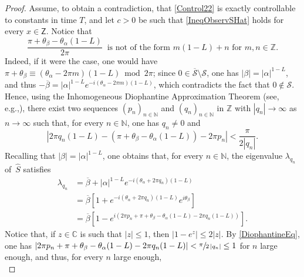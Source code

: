 \documentclass[10pt]{article}
\newcommand{\eg}{e.g.,\xspace}
\renewcommand{\eg}{e.g.,\xspace}
\theoremstyle{plain}
\theoremstyle{definition}
\newcommand{\abs}[1]{\left\lvert #1\right \rvert}
\numberwithin{equation}{section}\numberwithin{figure}{section}\emergencystretch=3em
\begin{document}
\begin{proof}
Assume, to obtain a contradiction, that \eqref{Control22} is exactly controllable to constants in time $T$, and let $c > 0$ be such that \eqref{IneqObservSHat} holds for every $x \in \mathsf Z$. Notice that
\begin{equation}\label{eq:mn}
\frac{\pi + \theta_\beta - \theta_\alpha(1 - L)}{2 \pi}\ \text{ is not of the form } m (1 - L) + n \text{ for } m, n \in \mathbb Z.
\end{equation}
Indeed, if it were the case, one would have $\pi + \theta_\beta \equiv (\theta_\alpha - 2 \pi m) (1 - L) \bmod 2 \pi$; since $0 \in \overline{\mathcal S} \setminus \mathcal S$, one has $\abs{\beta} = \abs{\alpha}^{1 - L}$, and thus $-\overline\beta = \abs{\alpha}^{1 - L} e^{- i (\theta_\alpha - 2 \pi m) (1 - L)}$, which contradicts the fact that $0 \notin \mathcal S$. Hence, using the Inhomogeneous Diophantine Approximation Theorem (see, \eg \cite[Chap.\,III, Th.\,II\,A]{Cassels1957Introduction}), there exist two sequences $(p_n)_{n \in \mathbb N}$ and $(q_n)_{n \in \mathbb N}$ in $\mathbb Z$ with $\abs{q_n} \to \infty$ as $n \to \infty$ such that, for every $n \in \mathbb N$, one has $q_n \neq 0$ and
\begin{equation}
\label{DiophantineEq}
\abs{2 \pi q_n (1 - L) - (\pi + \theta_\beta - \theta_\alpha (1 - L)) - 2 \pi p_n} < \frac{\pi}{2 \abs{q_n}}.
\end{equation}
Recalling that $\abs{\beta} = \abs{\alpha}^{1 - L}$, one obtains that, for every $n \in \mathbb N$, the eigenvalue $\lambda_{q_n}$ of~$\widehat S$ satisfies
\begin{equation}
\label{LambdaN}
\begin{aligned}
\lambda_{q_n} & = \overline\beta + \abs{\alpha}^{1 - L} e^{- i (\theta_\alpha + 2 \pi q_n)(1 - L)} \\
& = \overline\beta\left[1 + e^{-i(\theta_\alpha + 2 \pi q_n)(1 - L)} e^{i \theta_\beta}\right] \\
& = \overline\beta\left[1 - e^{i (2 \pi p_n + \pi + \theta_\beta - \theta_\alpha(1 - L) - 2 \pi q_n (1 - L))}\right].
\end{aligned}
\end{equation}
Notice that, if $z \in \mathbb C$ is such that $\abs{z} \leq 1$, then $\abs{1 - e^z} \leq 2 \abs{z}$. By \eqref{DiophantineEq}, one has $\lvert 2 \pi p_n + \pi + \theta_\beta - \theta_\alpha(1 - L) - 2 \pi q_n (1 - L) \rvert < \sfrac{\pi}{2 \abs{q_n}} \leq 1$ for $n$ large enough, and thus, for every $n$ large enough,
\begin{equation}
\label{EstimLambdaN}

\end{equation}
\end{proof}
\end{document}
